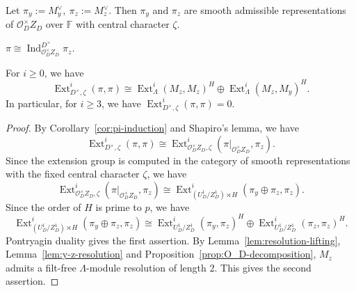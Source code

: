 \documentclass[11pt,a4paper]{article} %
\def\FF{\mathbb{F}}
\def\cO{\mathcal{O}}
\def\Ext{\operatorname{Ext}} %
\def\Ind{\operatorname{Ind}}
\begin{document}
Let $\pi_y:=M_y^{\vee},~\pi_z:=M_z^{\vee}$. Then $\pi_y$ and $\pi_z$ are smooth admissible representations of $\cO_D^{\times}Z_D$ over $\FF$ with central character $\zeta$.

\begin{corollary}\label{cor:pi-induction}
    $\pi\cong\Ind_{\cO_D^{\times}Z_D}^{D^{\times}}\pi_z$.
\end{corollary}

\begin{corollary}\label{cor:Ext-decomposition}
    For $i\ge0$, we have 
    \[
    \Ext^i_{D^\times,\zeta}(\pi,\pi)\cong\Ext^i_{\Lambda}(M_z,M_z)^H\oplus\Ext^i_{\Lambda}(M_z,M_y)^H.
    \]
    In particular, for $i\ge3$, we have $\Ext^i_{D^\times,\zeta}(\pi,\pi)=0$.
\end{corollary}

\begin{proof}
    By Corollary~\ref{cor:pi-induction} and Shapiro's lemma, we have 
    \[
    \Ext^i_{D^\times,\zeta}(\pi,\pi)\cong\Ext^i_{\cO_D^{\times}Z_D,\zeta}(\pi|_{\cO_D^{\times}Z_D},\pi_z).
    \]
    Since the extension group is computed in the category of smooth representations with the fixed central character $\zeta$, we have 
    \[
    \Ext^i_{\cO_D^{\times}Z_D,\zeta}(\pi|_{\cO_D^{\times}Z_D},\pi_z)\cong\Ext^i_{(U_D^1/Z_D^1)\rtimes H}(\pi_y\oplus\pi_z,\pi_z).
    \]
    Since the order of $H$ is prime to $p$, we have 
    \[
    \Ext^i_{(U_D^1/Z_D^1)\rtimes H}(\pi_y\oplus\pi_z,\pi_z)\cong\Ext^i_{U_D^1/Z_D^1}(\pi_y,\pi_z)^H\oplus\Ext^i_{U_D^1/Z_D^1}(\pi_z,\pi_z)^H.
    \]
    Pontryagin duality gives the first assertion. By Lemma~\ref{lem:resolution-lifting}, Lemma~\ref{lem:y-z-resolution} and Proposition~\ref{prop:O_D-decomposition}, $M_z$ admits a filt-free $\Lambda$-module resolution of length 2. This gives the second assertion.
\end{proof}
\end{document}
